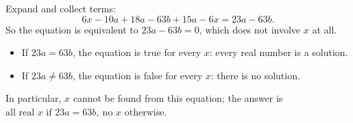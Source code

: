 Expand and collect terms:
\[
6x-10a+18a-63b+15a-6x=23a-63b .
\]
So the equation is equivalent to $23a-63b=0$, which does not involve $x$ at all.
\begin{itemize}
\item If $23a=63b$, the equation is true for every $x$: every real number is a solution.
\item If $23a\ne63b$, the equation is false for every $x$: there is no solution.
\end{itemize}
In particular, $x$ cannot be found from this equation; the answer is $\boxed{\text{all real }x\text{ if }23a=63b,\ \text{no }x\text{ otherwise}}$.
